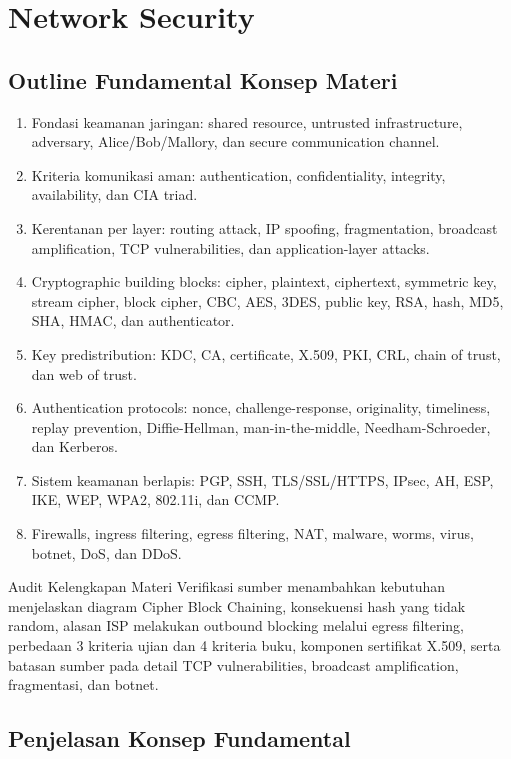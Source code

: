 \section{Network Security}

\subsection{Outline Fundamental Konsep Materi}

\begin{enumerate}
    \item Fondasi keamanan jaringan: shared resource, untrusted infrastructure, adversary, Alice/Bob/Mallory, dan secure communication channel.
    \item Kriteria komunikasi aman: authentication, confidentiality, integrity, availability, dan CIA triad.
    \item Kerentanan per layer: routing attack, IP spoofing, fragmentation, broadcast amplification, TCP vulnerabilities, dan application-layer attacks.
    \item Cryptographic building blocks: cipher, plaintext, ciphertext, symmetric key, stream cipher, block cipher, CBC, AES, 3DES, public key, RSA, hash, MD5, SHA, HMAC, dan authenticator.
    \item Key predistribution: KDC, CA, certificate, X.509, PKI, CRL, chain of trust, dan web of trust.
    \item Authentication protocols: nonce, challenge-response, originality, timeliness, replay prevention, Diffie-Hellman, man-in-the-middle, Needham-Schroeder, dan Kerberos.
    \item Sistem keamanan berlapis: PGP, SSH, TLS/SSL/HTTPS, IPsec, AH, ESP, IKE, WEP, WPA2, 802.11i, dan CCMP.
    \item Firewalls, ingress filtering, egress filtering, NAT, malware, worms, virus, botnet, DoS, dan DDoS.
\end{enumerate}

\begin{cmt}{Audit Kelengkapan Materi}{}
Verifikasi sumber menambahkan kebutuhan menjelaskan diagram Cipher Block Chaining, konsekuensi hash yang tidak random, alasan ISP melakukan outbound blocking melalui egress filtering, perbedaan 3 kriteria ujian dan 4 kriteria buku, komponen sertifikat X.509, serta batasan sumber pada detail TCP vulnerabilities, broadcast amplification, fragmentasi, dan botnet.
\end{cmt}

\subsection{Penjelasan Konsep Fundamental}

